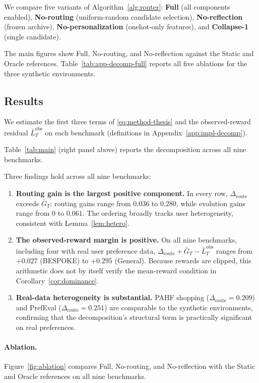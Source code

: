 \documentclass{article} %
\begin{document}
We compare five variants of Algorithm~\ref{alg:router}: \textbf{Full} (all components enabled), \textbf{No-routing} (uniform-random candidate selection), \textbf{No-reflection} (frozen archive), \textbf{No-personalization} (onehot-only features), and \textbf{Collapse-1} (single candidate).

The main figures show Full, No-routing, and No-reflection against the Static
and Oracle references. Table~\ref{tab:app-decomp-full} reports all five
ablations for the three synthetic environments.

\subsection{Results}

\label{sec:exp-results}

We estimate the first three terms of \eqref{eq:method-thesis} and the observed-reward residual \(\bar L_T^{\mathrm{obs}}\) on each benchmark (definitions in Appendix~\ref{app:impl-decomp}).

Table~\ref{tab:main} (right panel above) reports the decomposition across all nine benchmarks.

Three findings hold across all nine benchmarks:

\begin{enumerate}
\item \textbf{Routing gain is the largest positive component.} In every row, $\Delta_{\mathrm{route}}$ exceeds $\bar G_T$: routing gains range from $0.036$ to $0.280$, while evolution gains range from $0$ to $0.061$. The ordering broadly tracks user heterogeneity, consistent with Lemma~\ref{lem:hetero}.
\item \textbf{The observed-reward margin is positive.} On all nine benchmarks, including four with real user preference data, $\Delta_{\mathrm{route}}+\bar G_T-\bar L_T^{\mathrm{obs}}$ ranges from $+0.027$ (BESPOKE) to $+0.295$ (General). Because rewards are clipped, this arithmetic does not by itself verify the mean-reward condition in Corollary~\ref{cor:dominance}.
\item \textbf{Real-data heterogeneity is substantial.} PAHF shopping ($\Delta_{\mathrm{route}}{=}0.209$) and PrefEval ($\Delta_{\mathrm{route}}{=}0.251$) are comparable to the synthetic environments, confirming that the decomposition's structural term is practically significant on real preferences.
\end{enumerate}

\paragraph{Ablation.} Figure~\ref{fig:ablation} compares Full, No-routing, and
No-reflection with the Static and Oracle references on all nine benchmarks.
\end{document}
